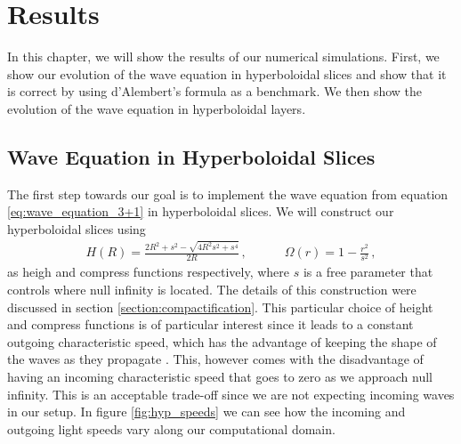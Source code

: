 
\chapter{Results}
\label{chapter:results}

In this chapter, we will show the results of our numerical simulations. First, we show our evolution of the wave equation in hyperboloidal slices and show that it is correct by using d'Alembert's formula as a benchmark. We then show the evolution of the wave equation in hyperboloidal layers.


\section{Wave Equation in Hyperboloidal Slices}
\label{section:hyp_wave}

The first step towards our goal is to implement the wave equation from equation \eqref{eq:wave_equation_3+1} in hyperboloidal slices. We will construct our hyperboloidal slices using 
%
\begin{align}
    H(R) = \frac{2 R^2 + s^2 - \sqrt{4 R^2 s^2 + s^4}}{2 R} \,, \quad \quad \quad \Omega(r) = 1 - \frac{r^2}{s^2} \,,
    \label{eq:hyp_coordinates}
\end{align}
%
as heigh and compress functions respectively, where $s$ is a free parameter that controls where null infinity is located. The details of this construction were discussed in section \ref{section:compactification}. This particular choice of height and compress functions is of particular interest since it leads to a constant outgoing characteristic speed, which has the advantage of keeping the shape of the waves as they propagate \cite{Hyperboloidal_layers_for_hyperbolic_equations_on_unbounded_domains,The_evolution_of_hyperboloidal_data_with_the_dual_foliation_formalism_Mathematical_analysis_and_wave_equation_tests}. This, however comes with the disadvantage of having an incoming characteristic speed that goes to zero as we approach null infinity. This is an acceptable trade-off since we are not expecting incoming waves in our setup. In figure \ref{fig:hyp_speeds} we can see how the incoming and outgoing light speeds vary along our computational domain.

